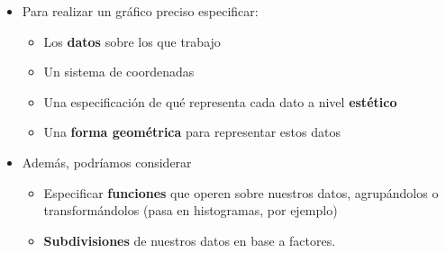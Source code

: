 \documentclass[ignorenonframetext,]{beamer}
\providecommand{\tightlist}{%
  \setlength{\itemsep}{0pt}\setlength{\parskip}{0pt}}
\begin{document}
\begin{frame}{}
\protect\hypertarget{section-8}{}


\begin{itemize}
\tightlist
\item
  Para realizar un gráfico preciso especificar:

  \begin{itemize}
  \tightlist
  \item
    Los \textbf{datos} sobre los que trabajo
  \item
    Un sistema de coordenadas
  \item
    Una especificación de qué representa cada dato a nivel
    \textbf{estético}
  \item
    Una \textbf{forma geométrica} para representar estos datos
  \end{itemize}
\item
  Además, podríamos considerar

  \begin{itemize}
  \tightlist
  \item
    Especificar \textbf{funciones} que operen sobre nuestros datos,
    agrupándolos o transformándolos (pasa en histogramas, por ejemplo)
  \item
    \textbf{Subdivisiones} de nuestros datos en base a factores.
  \end{itemize}
\end{itemize}

\end{frame}
\end{document}
